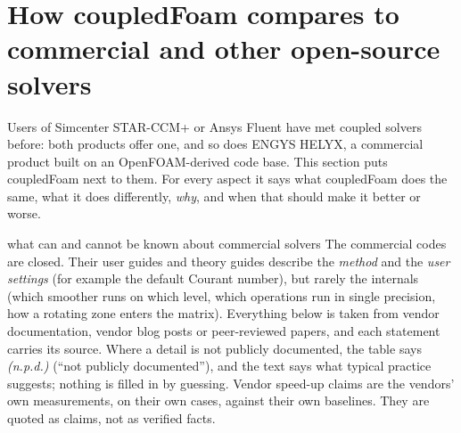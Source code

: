 %

\providecommand{\cmpnpd}{\textit{(n.p.d.)}}
\providecommand{\cmphead}[1]{\multicolumn{6}{l}{\rule{0pt}{2.6ex}\textbf{#1}}\\*[1pt]}
\makeatletter
{}
\makeatother

\section{How coupledFoam compares to commercial and other open-source solvers}
\label{sec:compare}

Users of Simcenter STAR-CCM+ or Ansys Fluent have met coupled solvers
before: both products offer one, and so does ENGYS HELYX, a commercial
product built on an OpenFOAM-derived code base.
This section puts coupledFoam next to them. For every aspect it says what
coupledFoam does the same, what it does differently, \emph{why}, and when
that should make it better or worse.

\begin{pitfall}{what can and cannot be known about commercial solvers}
  The commercial codes are closed. Their user guides and theory guides
  describe the \emph{method} and the \emph{user settings} (for example the
  default Courant number), but rarely the internals (which smoother runs on
  which level, which operations run in single precision, how a rotating
  zone enters the matrix). Everything below is taken from vendor
  documentation, vendor blog posts or peer-reviewed papers, and each
  statement carries its source. Where a detail is not publicly documented,
  the table says \cmpnpd{} (``not publicly documented''), and the text says
  what typical practice suggests; nothing is filled in by guessing. Vendor
  speed-up claims are the vendors' own measurements, on their own cases,
  against their own baselines. They are quoted as claims, not as verified
  facts.
\end{pitfall}

